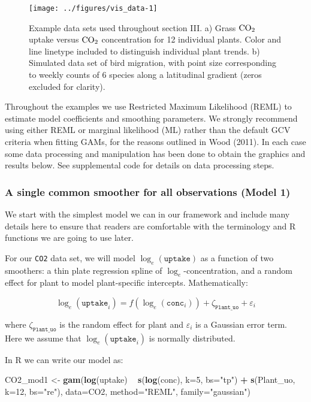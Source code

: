 \documentclass[12pt]{article}
\newenvironment{Shaded}{\begin{snugshade}}{\end{snugshade}}
\newcommand{\KeywordTok}[1]{\textcolor[rgb]{0.13,0.29,0.53}{\textbf{#1}}}
\newcommand{\DataTypeTok}[1]{\textcolor[rgb]{0.13,0.29,0.53}{#1}}
\newcommand{\DecValTok}[1]{\textcolor[rgb]{0.00,0.00,0.81}{#1}}
\newcommand{\StringTok}[1]{\textcolor[rgb]{0.31,0.60,0.02}{#1}}
\newcommand{\OperatorTok}[1]{\textcolor[rgb]{0.81,0.36,0.00}{\textbf{#1}}}
\newcommand{\NormalTok}[1]{#1}
\begin{document}
\begin{figure}
\texttt{[image: ../figures/vis\_data-1]} \caption{\label{fig:vis_data}Example data sets used throughout section III. a) Grass $\text{CO}\textsubscript{2}$ uptake versus $\text{CO}\textsubscript{2}$ concentration for 12 individual plants. Color and line linetype included to distinguish individual plant trends. b) Simulated data set of bird migration, with point size corresponding to weekly counts of 6 species along a latitudinal gradient (zeros excluded for clarity). }\label{fig:vis_data}
\end{figure}

Throughout the examples we use Restricted Maximum Likelihood (REML) to
estimate model coefficients and smoothing parameters. We strongly
recommend using either REML or marginal likelihood (ML) rather than the
default GCV criteria when fitting GAMs, for the reasons outlined in Wood
(2011). In each case some data processing and manipulation has been done
to obtain the graphics and results below. See supplemental code for
details on data processing steps.

\subsubsection{A single common smoother for all observations (Model
1)}\label{a-single-common-smoother-for-all-observations-model-1}

We start with the simplest model we can in our framework and include
many details here to ensure that readers are comfortable with the
terminology and R functions we are going to use later.

For our \texttt{CO2} data set, we will model \(\log_e(\texttt{uptake})\)
as a function of two smoothers: a thin plate regression spline of
\(\log_e\)-concentration, and a random effect for plant to model
plant-specific intercepts. Mathematically:

\[
\log_e(\texttt{uptake}_i) = f(\log_e(\texttt{conc}_i)) + \zeta_\texttt{Plant\_uo} + \varepsilon_i
\]

where \(\zeta_\texttt{Plant\_uo}\) is the random effect for plant and
\(\varepsilon_i\) is a Gaussian error term. Here we assume that
\(\log_e(\texttt{uptake}_i)\) is normally distributed.

In R we can write our model as:

\begin{Shaded}
\begin{Highlighting}[]
\NormalTok{CO2_mod1 <-}\StringTok{ }\KeywordTok{gam}\NormalTok{(}\KeywordTok{log}\NormalTok{(uptake) }\OperatorTok{~}\StringTok{ }\KeywordTok{s}\NormalTok{(}\KeywordTok{log}\NormalTok{(conc), }\DataTypeTok{k=}\DecValTok{5}\NormalTok{, }\DataTypeTok{bs=}\StringTok{"tp"}\NormalTok{) }\OperatorTok{+}
\StringTok{                  }\KeywordTok{s}\NormalTok{(Plant_uo, }\DataTypeTok{k=}\DecValTok{12}\NormalTok{, }\DataTypeTok{bs=}\StringTok{"re"}\NormalTok{),}
                \DataTypeTok{data=}\NormalTok{CO2, }\DataTypeTok{method=}\StringTok{"REML"}\NormalTok{, }\DataTypeTok{family=}\StringTok{"gaussian"}\NormalTok{)}
\end{Highlighting}
\end{Shaded}
\end{document}
